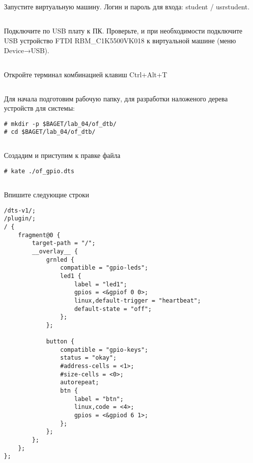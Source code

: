 \subsection{}Запустите виртуальную машину. Логин и пароль для входа: student / usrstudent.

\subsection{}Подключите по USB плату к ПК. Проверьте, и при необходимости подключите USB устройство FTDI RBM\_C1K5500VK018 к виртуальной машине (меню Device→USB).

\subsection{}Откройте терминал комбинацией клавиш Ctrl+Alt+T

\subsection{}Для начала подготовим рабочую папку, для разработки наложеного дерева устройств для системы: 
\begin{lstlisting}[style=bash]
# mkdir -p $BAGET/lab_04/of_dtb/
# cd $BAGET/lab_04/of_dtb/
\end{lstlisting}

\subsection{}Создадим и приступим к правке файла 
\begin{lstlisting}[style=bash]
# kate ./of_gpio.dts
\end{lstlisting}

\subsection{}Впишите следующие строки
\begin{lstlisting}[style=stdout]
/dts-v1/;
/plugin/;
/ {
	fragment@0 {
		target-path = "/";
		__overlay__ {
			grnled {
				compatible = "gpio-leds";
				led1 {
					label = "led1";
					gpios = <&gpiof 0 0>;
					linux,default-trigger = "heartbeat";
					default-state = "off";
				};
			};
			
			button {
				compatible = "gpio-keys";
				status = "okay";
				#address-cells = <1>;
				#size-cells = <0>;
				autorepeat;
				btn {
					label = "btn";
					linux,code = <4>;
					gpios = <&gpiod 6 1>;
				};
			};
		};
	};
};
\end{lstlisting}

